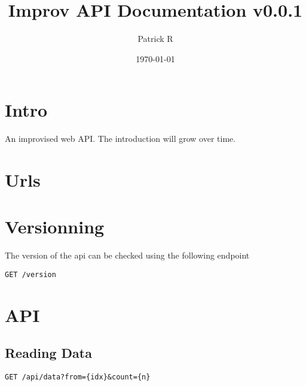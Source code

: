 \documentclass{article}
\title{Improv API Documentation v0.0.1}
\author{Patrick R}
\date{\today}
\begin{document}
\maketitle


\section{Intro}

An improvised web API. The introduction will grow over time.

\section{Urls}
\color{mauve}
\color{black}

\section{Versionning}
The version of the api can be checked using the following endpoint
\begin{lstlisting}
GET /version
\end{lstlisting} 

\section{API}

\subsection{Reading Data}

\begin{lstlisting}
GET /api/data?from={idx}&count={n}
\end{lstlisting}
 
\end{document}
